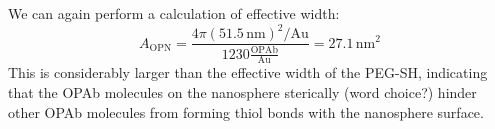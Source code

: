 We can again perform a calculation of effective width: \[A_{\mathrm{OPN}}=\frac{4\pi(51.5\mathrm{\,nm})^2/\mathrm{Au}}{1230\mathrm{\frac{OPAb}{Au}}}=27.1\,\mathrm{nm}^2\]
This is considerably larger than the effective width of the PEG-SH, indicating that the OPAb molecules on the nanosphere sterically (word choice?) hinder other OPAb molecules from forming thiol bonds with the nanosphere surface.




